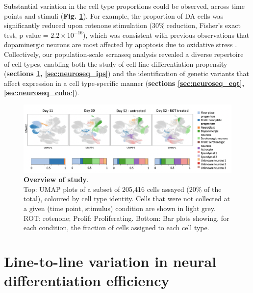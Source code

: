 Substantial variation in the cell type proportions could be observed, across time points and stimuli (\textbf{Fig. \ref{fig:neuroseq_overview}}). 
For example, the proportion of DA cells was significantly reduced upon rotenone stimulation (30\% reduction, Fisher’s exact test, p value = $2.2 \times 10^{-16}$), which was consistent with previous observations that dopaminergic neurons are most affected by apoptosis due to oxidative stress \cite{sherer2003mechanism, knonagel1992autologous, cannon2009highly}.
Collectively, our population-scale \gls{scrnaseq} analysis revealed a diverse repertoire of cell types, enabling both the study of cell line differentiation propensity (\textbf{sections \ref{sec:neuroseq_diff_eff}, \ref{sec:neuroseq_ips}}) and the identification of genetic variants that affect expression in a cell type-specific manner (\textbf{sections \ref{sec:neuroseq_eqt}, \ref{sec:neuroseq_coloc}}). 
\\ 

\begin{figure}[h]
\centering
\includegraphics[width=17cm]{Chapter5/Fig/neuroseq_overview.png}
\caption[Overview of study]{\textbf{Overview of study}.\\
Top: UMAP plots of a subset of 205,416 cells assayed (20\% of the total), coloured by 
cell type identity. 
Cells that were not collected at a given (time point, stimulus) condition are shown in light grey. 
ROT: rotenone; Prolif: Proliferating. 
Bottom: Bar plots showing, for each condition, the fraction of cells assigned to each cell type.}
\label{fig:neuroseq_overview}
\end{figure}


\newpage

\section{Line-to-line variation in neural differentiation efficiency}
\label{sec:neuroseq_diff_eff}

